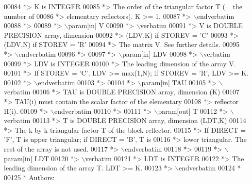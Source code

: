 \begin{DoxyCode}
00084 \textcolor{comment}{*>          K is INTEGER}
00085 \textcolor{comment}{*>          The order of the triangular factor T (= the number of}
00086 \textcolor{comment}{*>          elementary reflectors). K >= 1.}
00087 \textcolor{comment}{*> \(\backslash\)endverbatim}
00088 \textcolor{comment}{*>}
00089 \textcolor{comment}{*> \(\backslash\)param[in] V}
00090 \textcolor{comment}{*> \(\backslash\)verbatim}
00091 \textcolor{comment}{*>          V is DOUBLE PRECISION array, dimension}
00092 \textcolor{comment}{*>                               (LDV,K) if STOREV = 'C'}
00093 \textcolor{comment}{*>                               (LDV,N) if STOREV = 'R'}
00094 \textcolor{comment}{*>          The matrix V. See further details.}
00095 \textcolor{comment}{*> \(\backslash\)endverbatim}
00096 \textcolor{comment}{*>}
00097 \textcolor{comment}{*> \(\backslash\)param[in] LDV}
00098 \textcolor{comment}{*> \(\backslash\)verbatim}
00099 \textcolor{comment}{*>          LDV is INTEGER}
00100 \textcolor{comment}{*>          The leading dimension of the array V.}
00101 \textcolor{comment}{*>          If STOREV = 'C', LDV >= max(1,N); if STOREV = 'R', LDV >= K.}
00102 \textcolor{comment}{*> \(\backslash\)endverbatim}
00103 \textcolor{comment}{*>}
00104 \textcolor{comment}{*> \(\backslash\)param[in] TAU}
00105 \textcolor{comment}{*> \(\backslash\)verbatim}
00106 \textcolor{comment}{*>          TAU is DOUBLE PRECISION array, dimension (K)}
00107 \textcolor{comment}{*>          TAU(i) must contain the scalar factor of the elementary}
00108 \textcolor{comment}{*>          reflector H(i).}
00109 \textcolor{comment}{*> \(\backslash\)endverbatim}
00110 \textcolor{comment}{*>}
00111 \textcolor{comment}{*> \(\backslash\)param[out] T}
00112 \textcolor{comment}{*> \(\backslash\)verbatim}
00113 \textcolor{comment}{*>          T is DOUBLE PRECISION array, dimension (LDT,K)}
00114 \textcolor{comment}{*>          The k by k triangular factor T of the block reflector.}
00115 \textcolor{comment}{*>          If DIRECT = 'F', T is upper triangular; if DIRECT = 'B', T is}
00116 \textcolor{comment}{*>          lower triangular. The rest of the array is not used.}
00117 \textcolor{comment}{*> \(\backslash\)endverbatim}
00118 \textcolor{comment}{*>}
00119 \textcolor{comment}{*> \(\backslash\)param[in] LDT}
00120 \textcolor{comment}{*> \(\backslash\)verbatim}
00121 \textcolor{comment}{*>          LDT is INTEGER}
00122 \textcolor{comment}{*>          The leading dimension of the array T. LDT >= K.}
00123 \textcolor{comment}{*> \(\backslash\)endverbatim}
00124 \textcolor{comment}{*}
00125 \textcolor{comment}{*  Authors:}

\end{DoxyCode}
